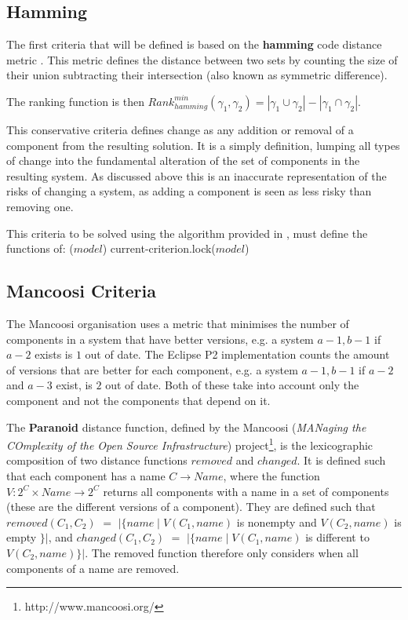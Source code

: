 \subsection{Hamming}
The first criteria that will be defined is based on the \textbf{hamming} code distance metric \cite{hamming1950error}.
This metric defines the distance between two sets by counting the size of their union subtracting their intersection (also known as symmetric difference).

The ranking function is then $Rank^{min}_{hamming}(\gamma_1,\gamma_2) = |\gamma_1 \cup \gamma_2| - |\gamma_1 \cap \gamma_2|$.

This conservative criteria defines change as any addition or removal of a component from the resulting solution.
It is a simply definition, lumping all types of change into the fundamental alteration of the set of components in the resulting system.
As discussed above this is an inaccurate representation of the risks of changing a system, as adding a component is seen as less risky than removing one.

This criteria to be solved using the algorithm provided in , must define the functions of:
(\(model\))
current-criterion.lock(\(model\))

\subsection{Mancoosi Criteria}

The Mancoosi organisation uses a metric that minimises the number of components in a system that have better versions, 
e.g. a system $a-1,b-1$ if $a-2$ exists is $1$ out of date. 
The Eclipse P2 implementation counts the amount of versions that are better for each component,
e.g. a system $a-1,b-1$ if $a-2$ and $a-3$ exist, is $2$ out of date.
Both of these take into account only the component and not the components that depend on it.





The \textbf{Paranoid} distance function, 
defined by the Mancoosi (\textit{MANaging the COmplexity of the Open Source Infrastructure}) project\footnote{http://www.mancoosi.org/}, 
is the lexicographic composition of two distance functions $removed$ and $changed$.
It is defined such that each component has a name $C \rightarrow Name$,
where the function $V: 2^C \times Name \rightarrow 2^C$ returns all components with a name in a set of components 
(these are the different versions of a component).
They are defined such that $removed(C_1,C_2)$ $=$ $|\{name \mid V(C_1,name) $ is nonempty and $V(C_2,name)$ is empty $\}|$,
and $changed(C_1,C_2)$ $=$ $|\{name \mid V(C_1,name)$ is different to $V(C_2,name)\}|$.
The removed function therefore only considers when all components of a name are removed. 


